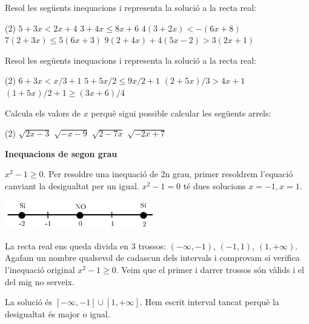 \begin{mylist}
\exer  Resol les següents inequacions i representa la solució a la recta real:
 \begin{tasks}(2)
\task $5 + 3{x} < 2{x} + 4 $
\task $3 + 4{x} \leq 8{x} + 6$ 
\task $4(3 + 2{x}) < -(6{x} + 8)$  
\task $7(2 + 3{x}) \leq 5(6{x} + 3)$
 \task $9(2 + 4{x}) + 4(5{x} - 2) > 3(2{x} + 1)$ 
 \end{tasks}
\answers{[$(-\infty,-1)$, $[9/4,+\infty)$, $(-\infty,x-10/7)$, $[-1/9,+\infty)$, $(-7/50,+\infty)$]}
 
\exer  Resol les següents inequacions i representa la solució a la recta real:
  \begin{tasks}(2)
\task $6 + 3{x} < {x}/3 + 1 $
\task $5 + 5{x}/2 \leq 9{x}/2 + 1$  
\task $(2 + 5{x})/3 > 4{x} + 1  $
\task $(1 + 5{x})/2 + 1 \geq (3{x} + 6)/4$
 \end{tasks}
  \answers{[$(-\infty,-1)$, $[2,+\infty]$, $(-\infty,-1/7)$, $[0,+\infty)$]}

 
\exer  Calcula els valors de  $x$ perquè sigui possible calcular les següents arrels:
  \begin{tasks}(2)
\task $\sqrt{2x-3} $  \task $\sqrt{-x-9} $  \task $\sqrt{2-7x} $   \task $\sqrt{-2x+7} $
 \end{tasks}
  \answers{[$[3/2,+\infty)$, $(-\infty,-9]$, $(-\infty,2/7]$, $(-\infty,7/2]$]}

\end{mylist}

\begin{example}
	\textbf{Inequacions de segon grau} 
	
	 $x^2-1 \ge 0$. Per resoldre una inequació de 2n grau, primer resoldrem l'equació canviant la desigualtat per un igual. $x^2-1 = 0$ té dues solucions $x=-1, x=1$. 
	
	\begin{center}
		\includegraphics[width=6.5cm]{img-02/inequacion2ngrau.pdf}
	\end{center}
	La recta real ens queda divida en 3 trossos: $(-\infty,-1)$, $(-1,1)$, $(1,+\infty)$. Agafam un nombre qualsevol de cadascun dels intervals i comprovam si verifica l'inequació original $x^2-1 \ge 0$. Veim que el primer i darrer trossos són vàlids i el del mig no serveix.
	
	La solució és  $[-\infty,-1]\cup[1,+\infty]$. Hem escrit interval tancat perquè la desigualtat és major o igual.
\end{example}	
 	 
